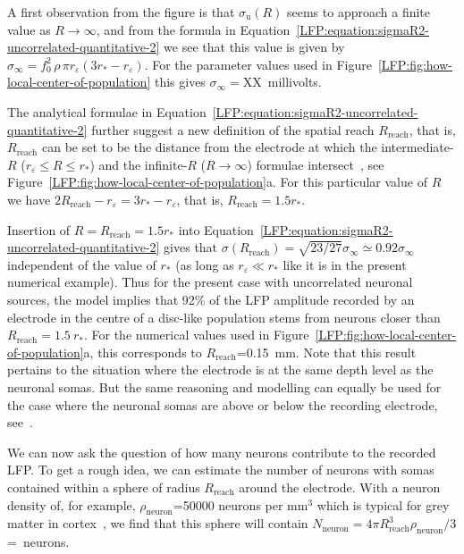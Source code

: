 A first observation from the figure is that $\sigma_\text{u}(R)$ seems to approach a finite
value as $R \rightarrow \infty$, and from the formula in Equation~\ref{LFP:equation:sigmaR2-uncorrelated-quantitative-2}  
we see that this value is given by $\sigma_\infty = f_0^2 \, \rho \, \pi r_\varepsilon (3 r_* - r_\varepsilon)$. For the parameter values used in Figure~\ref{LFP:fig:how-local-center-of-population} this gives  
$\sigma_\infty=$XX~millivolts. 

The analytical formulae in Equation~\ref{LFP:equation:sigmaR2-uncorrelated-quantitative-2} 
further suggest a new definition of the spatial reach $R_\text{reach}$, that is, $R_\text{reach}$ 
can be set to be the distance from the electrode at which the 
intermediate-$R$ ($r_\varepsilon \le R \le r_*$) and the 
infinite-$R$ ($R \rightarrow \infty$) formulae intersect~\cite{Einevoll2013a}, see 
Figure~\ref{LFP:fig:how-local-center-of-population}a. For this particular value of $R$ we have 
$2R_\text{reach}-r_\varepsilon=3 r_* - r_\varepsilon$, that is, $R_\text{reach} =1.5 r_*$. 

Insertion of $R=R_\text{reach}=1.5 r_*$ into Equation~\ref{LFP:equation:sigmaR2-uncorrelated-quantitative-2} 
gives that $\sigma (R_\text{reach})=\sqrt{23/27}\sigma_\infty \simeq 0.92 \sigma_\infty$ independent of the value of $r_*$ (as long as $r_\varepsilon \ll r_*$ like it is in the present numerical example). Thus for the present case with uncorrelated neuronal sources, the model implies that 92\% of the LFP amplitude recorded by an electrode in the centre of a disc-like population 
stems from neurons closer than $R_\text{reach}=1.5~r_*$. For the numerical values
used in Figure~\ref{LFP:fig:how-local-center-of-population}a,
this corresponds to $R_\text{reach}$=0.15~mm. 
Note that this result pertains to the situation where the electrode is at the same depth level as the neuronal somas. But the same reasoning and modelling can equally be used for the case where the neuronal somas are above or below the recording electrode, see~.

We can now ask the question of how many neurons contribute to the recorded LFP. To get a rough idea, we can estimate the number of neurons with somas contained within a sphere of radius $R_\text{reach}$
around the electrode. With a neuron density of, for example, $\rho_\text{neuron}$=50000 neurons per mm$^3$ which is typical for grey matter in 
cortex~, we find that this sphere will contain $N_\text{neuron}=4 \pi R_\text{reach}^3 \rho_\text{neuron}/3$=~neurons.


